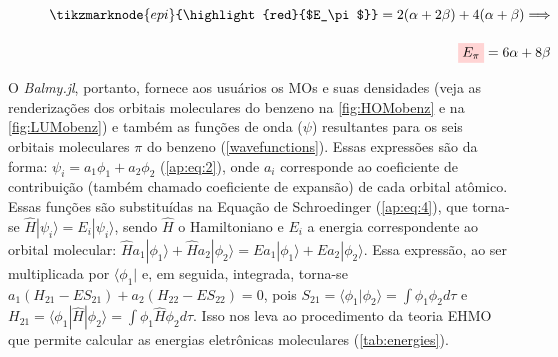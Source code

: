 \begin{figure}[htb]
\vspace{2\baselineskip}

\begin{equation}
\begin{split}
    \label{epi}
    \tikzmarknode{epi}{\highlight{red}{$E_\pi$}} = 2(\alpha + 2\beta) + 4(\alpha + \beta) \Longrightarrow \\[0.35cm] \highlight{red}{$E_\pi$} = 6\alpha + 8\beta
\end{split}
\end{equation}
\end{figure}

O \textit{Balmy.jl}, portanto, fornece aos usuários os \gls{MOs} e suas densidades (veja as renderizações dos orbitais moleculares do benzeno na \autoref{fig:HOMobenz} e na \autoref{fig:LUMobenz}) e também as funções de onda ($\psi$) resultantes para os seis orbitais moleculares $\pi$ do benzeno (\autoref{wavefunctions}). Essas expressões são da forma: $\psi_i = a_1 \phi_1 + a_2 \phi_2$ (\autoref{ap:eq:2}), onde $a_i$ corresponde ao coeficiente de contribuição (também chamado coeficiente de expansão) de cada orbital atômico. Essas funções são substituídas na Equação de Schroedinger (\autoref{ap:eq:4}), que torna-se $\hat{H} |\psi_i \rangle = E_i |\psi_i \rangle$, sendo $\hat{H}$ o Hamiltoniano e $E_i$ a energia correspondente ao orbital molecular: $\hat{H}a_1|\phi_1\rangle + \hat{H}a_2|\phi_2\rangle = Ea_1|\phi_1\rangle + Ea_2|\phi_2\rangle$. Essa expressão, ao ser multiplicada por $\langle \phi_1 |$ e, em seguida, integrada, torna-se $a_1(H_{21} - ES_{21}) + a_2(H_{22} - ES_{22}) = 0$, pois $S_{21} = \langle \phi_1 | \phi_2 \rangle = \displaystyle \int \phi_1 \phi_2 d\tau$ e $H_{21} = \langle \phi_1 | \hat{H} | \phi_2 \rangle = \displaystyle \int \phi_1 \hat{H} \phi_2 d\tau$. Isso nos leva ao procedimento da teoria \gls{EHMO} que permite calcular as energias eletrônicas moleculares (\autoref{tab:energies}).

